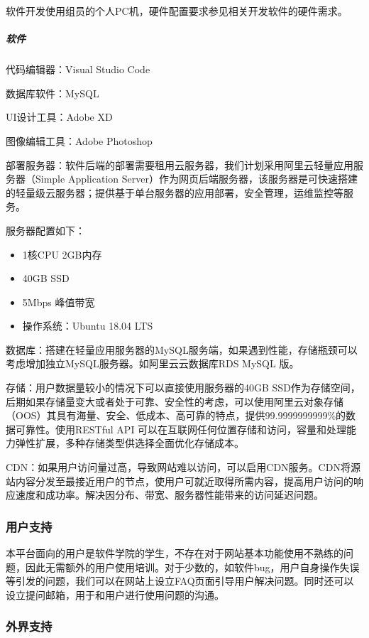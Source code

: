 \documentclass[
]{article}
\begin{document}
软件开发使用组员的个人PC机，硬件配置要求参见相关开发软件的硬件需求。

\hypertarget{header-n579}{%
\subparagraph{软件}\label{header-n579}}

代码编辑器：Visual Studio Code

数据库软件：MySQL

UI设计工具：Adobe XD

图像编辑工具：Adobe Photoshop

部署服务器：软件后端的部署需要租用云服务器，我们计划采用阿里云轻量应用服务器（Simple
Application
Server）作为网页后端服务器，该服务器是可快速搭建的轻量级云服务器；提供基于单台服务器的应用部署，安全管理，运维监控等服务。

服务器配置如下：

\begin{itemize}
\item
  1核CPU 2GB内存
\item
  40GB SSD
\item
  5Mbps 峰值带宽
\item
  操作系统：Ubuntu 18.04 LTS
\end{itemize}

数据库：搭建在轻量应用服务器的MySQL服务端，如果遇到性能，存储瓶颈可以考虑增加独立MySQL服务器。如阿里云云数据库RDS
MySQL 版。

存储：用户数据量较小的情况下可以直接使用服务器的40GB
SSD作为存储空间，后期如果存储量变大或者处于可靠、安全性的考虑，可以使用阿里云对象存储（OOS）其具有海量、安全、低成本、高可靠的特点，提供99.9999999999\%的数据可靠性。使用RESTful
API
可以在互联网任何位置存储和访问，容量和处理能力弹性扩展，多种存储类型供选择全面优化存储成本。

CDN：如果用户访问量过高，导致网站难以访问，可以启用CDN服务。CDN将源站内容分发至最接近用户的节点，使用户可就近取得所需内容，提高用户访问的响应速度和成功率。解决因分布、带宽、服务器性能带来的访问延迟问题。

\hypertarget{header-n598}{%
\subsubsection{用户支持}\label{header-n598}}

本平台面向的用户是软件学院的学生，不存在对于网站基本功能使用不熟练的问题，因此无需额外的用户使用培训。对于少数的，如软件bug，用户自身操作失误等引发的问题，我们可以在网站上设立FAQ页面引导用户解决问题。同时还可以设立提问邮箱，用于和用户进行使用问题的沟通。

\hypertarget{header-n600}{%
\subsubsection{外界支持}\label{header-n600}}
\end{document}

